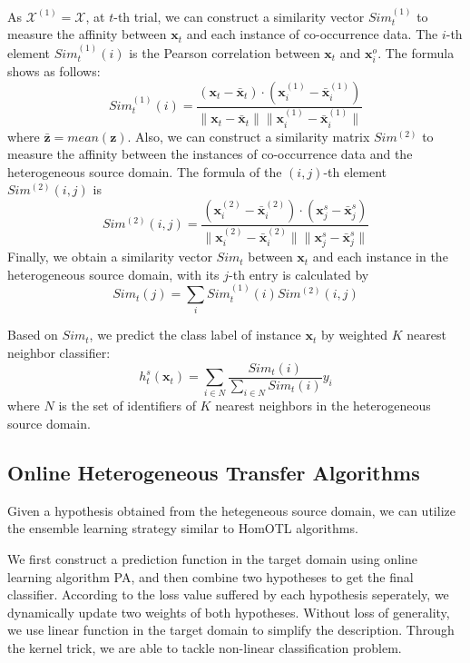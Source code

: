 \documentclass{article} %
\theoremstyle{remark}
\theoremstyle{definition}
\begin{document}
As $\mathcal{X}^{(1)} = \mathcal{X}$, at $t$-th trial, we can construct a similarity vector $Sim_{t}^{(1)}$ to measure the affinity between $\mathbf{x}_t$ and each instance of co-occurrence data. 
The $i$-th element $Sim_{t}^{(1)}(i)$ is the Pearson correlation between $\mathbf{x}_t$ and $\mathbf{x}_{i}^{o}$.
The formula shows as follows:
$$ Sim_{t}^{(1)}(i) = \frac{(\mathbf{x}_t - \bar{\mathbf{x}}_t) \cdot (\mathbf{x}_{i}^{(1)} - \bar{\mathbf{x}}_{i}^{(1)})}{\| \mathbf{x}_t - \bar{\mathbf{x}}_t \| \| \mathbf{x}_{i}^{(1)} - \bar{\mathbf{x}}_{i}^{(1)} \|} $$
where $\bar{\mathbf{z}} = mean(\mathbf{z})$.
Also, we can construct a similarity matrix $Sim^{(2)}$ to measure the affinity between the instances of co-occurrence data and the heterogeneous source domain.
The formula of the $(i,j)$-th element $Sim^{(2)}(i,j)$ is
$$ Sim^{(2)}(i,j) = \frac{(\mathbf{x}_{i}^{(2)} - \bar{\mathbf{x}}_{i}^{(2)}) \cdot (\mathbf{x}_{j}^{s} - \bar{\mathbf{x}}_{j}^{s})}{\| \mathbf{x}_{i}^{(2)} - \bar{\mathbf{x}}_{i}^{(2)} \| \| \mathbf{x}_{j}^{s} - \bar{\mathbf{x}}_{j}^{s} \|} $$
Finally, we obtain a similarity vector $Sim_t$ between $\mathbf{x}_t$ and each instance in the heterogeneous source domain, with its $j$-th entry is calculated by 
$$ Sim_t(j) = \sum\limits_i Sim_{t}^{(1)}(i) Sim^{(2)}(i,j) $$

Based on $Sim_t$, we predict the class label of instance $\mathbf{x}_t$ by weighted $K$ nearest neighbor classifier:
$$ h_{t}^{s}(\mathbf{x}_t) = \sum\limits_{i \in N} \frac{Sim_t(i)}{\sum\limits_{i \in N} Sim_t(i)} y_i $$
where $N$ is the set of identifiers of $K$ nearest neighbors in the heterogeneous source domain.

\subsection{Online Heterogeneous Transfer Algorithms}

Given a hypothesis obtained from the hetegeneous source domain, we can utilize the ensemble learning strategy similar to HomOTL algorithms.

We first construct a prediction function in the target domain using online learning algorithm PA, and then combine two hypotheses to get the final classifier.
According to the loss value suffered by each hypothesis seperately, we dynamically update two weights of both hypotheses.
Without loss of generality, we use linear function in the target domain to simplify the description.
Through the kernel trick, we are able to tackle non-linear classification problem.
\end{document}

